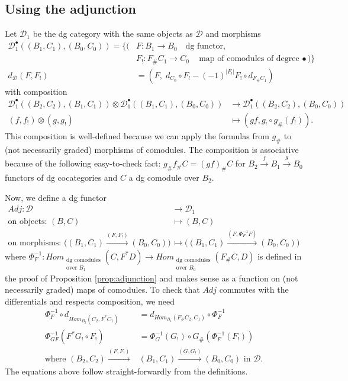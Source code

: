 \subsection{Using the adjunction}
\label{sec:use_adjunction}
Let $\mathcal{D}_1$ be the 
dg category with the same objects 
as $\mathcal{D}$ and morphisms
\begin{align*}
\mathcal{D}_1^\bullet(
  (B_1, C_1), (B_0,C_0))
= \big\{ \big(
& F: 
B_1 \to B_0 \quad \textrm{dg functor},\\
& F_!:
F_{\#}C_1 \to C_0 \quad \textrm{map of 
comodules of degree $\bullet$}
\big) \big\}\\
d_{\mathcal{D}}(F,F_!)
&=
(F,\; d_{C_0} \circ F_! - (-1)^{|F_!|} 
F_! \circ d_{F_\# C_1})
\end{align*}
with composition
\begin{align*}  
\mathcal{D}_1^\bullet(
  (B_2, C_2), (B_1, C_1)) \otimes  
  \mathcal{D}_1^\bullet(
  (B_1, C_1), (B_0, C_0))
&\to
\mathcal{D}_1^\bullet(
  (B_2, C_2), (B_0, C_0))\\
(f,f_!) \otimes (g, g_!)
&\mapsto
(gf, g_!\circ g_\#(f_!)).
\end{align*}
This composition is well-defined because 
we can apply the formulas from $g_\#$ to 
(not necessarily graded) morphisms of 
comodules. The composition is associative 
because of the following easy-to-check 
fact: $g_\#f_\#C = (gf)_\#C$ for 
$B_2 \xrightarrow{f} B_1 \xrightarrow{g} 
B_0$ functors of dg cocategories and $C$ 
a dg comodule over $B_2$.

Now, we define a dg functor 
\begin{align*}
Adj: \mathcal{D} 
&\to 
\mathcal{D}_1\\
\textrm{on objects: }(B,C)
& \mapsto
(B,C)\\
\textrm{on morphisms: }\bigg((B_1, C_1) 
  \xrightarrow{(F, F_!)} (B_0,C_0)\bigg)
& \mapsto
\bigg((B_1, C_1) 
  \xrightarrow{(F, \Phi^{-1}_FF)} 
  (B_0,C_0)\bigg)
\end{align*}
where 
$\Phi^{-1}_F:Hom_{\substack{
  \textrm{dg comodules}\\\textrm{over $B_1$}}}
  (C,F^*D) 
\to 
Hom_{\substack{
  \textrm{dg comodules}\\\textrm{over $B_0$}}}
  (F_\#C,D)$
is defined in the proof of Proposition 
\ref{prop:adjunction} and makes sense as 
a function on (not necessarily graded) 
maps of comodules. To check that $Adj$ 
commutes with the differentials and 
respects composition, we need
\begin{align*}
\Phi^{-1}_F \circ d_{Hom_{B_2}(C_2, F^*C_1)}
&= 
d_{Hom_{B_1}(F_\#C_2, C_1)} \circ \Phi^{-1}_F\\
\Phi^{-1}_{GF}(F^*G_! \circ F_!)
&=
\Phi^{-1}_G(G_!) \circ G_\#(\Phi^{-1}_F(F_!))\\
\textrm{where }
(B_2, C_2) 
  \xrightarrow{(F, F_!)} &(B_1,C_1)
  \xrightarrow{(G, G_!)} (B_0,C_0)
  \textrm{ in }\mathcal{D}.
\end{align*}
The equations above follow straight-forwardly 
from the definitions.
%
%
